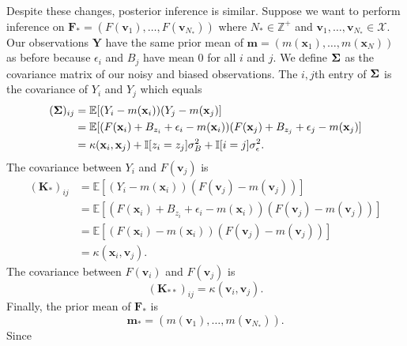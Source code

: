 Despite these changes, posterior inference is similar.
Suppose we want to perform inference on $\mathbf{F}_* = (F(\mathbf{v}_1), \dots, F(\mathbf{v}_{N_{*}}))$ where $N_{*} \in \mathbb{Z}^{+}$ and $\mathbf{v}_1, \dots, \mathbf{v}_{N_*} \in \mathcal{X}$.
Our observations $\mathbf{Y}$ have the same prior mean of $\mathbf{m} = (m(\mathbf{x}_1), \dots, m(\mathbf{x}_N))$ as before because $\epsilon_i$ and $B_j$ have mean 0 for all $i$ and $j$.
We define $\boldsymbol{\Sigma}$ as the covariance matrix of our noisy and biased observations.
The $i, j$th entry of $\boldsymbol{\Sigma}$ is the covariance of $Y_i$ and $Y_{j}$ which equals
\begin{align*}
    (\boldsymbol{\Sigma})_{ij}
    & = \mathbb{E}[(Y_i - m(\mathbf{x}_i))(Y_j - m(\mathbf{x}_j)] \\
    & = \mathbb{E}[(F(\mathbf{x}_i) + B_{z_i} + \epsilon_i - m(\mathbf{x}_i))(F(\mathbf{x}_j) + B_{z_j} + \epsilon_j - m(\mathbf{x}_j)] \\
    & = \kappa(\mathbf{x}_i, \mathbf{x}_{j}) + \mathbb{I}[z_i = z_{j}] \sigma^2_B + \mathbb{I}[i = j]\sigma^2_{ \epsilon }.
\end{align*}
The covariance between $Y_i$ and $F(\mathbf{v}_j)$ is
\begin{align*}
    (\mathbf{K}_{*})_{ij}
    & = \mathbb{E}[ (Y_i - m(\mathbf{x}_i))(F(\mathbf{v}_j) - m(\mathbf{v}_j)) ] \\
    & = \mathbb{E}[ (F(\mathbf{x}_i) + B_{z_i} + \epsilon_i - m(\mathbf{x}_i))(F(\mathbf{v}_j) - m(\mathbf{v}_j))] \\
    & = \mathbb{E}[ (F(\mathbf{x}_i) - m(\mathbf{x}_i))(F(\mathbf{v}_j) - m(\mathbf{v}_j))] \\
    & = \kappa(\mathbf{x}_i, \mathbf{v}_j).
\end{align*}
The covariance between $F(\mathbf{v}_i)$ and $F(\mathbf{v}_j)$ is
\begin{equation*}
    (\mathbf{K}_{* *})_{ij} = \kappa(\mathbf{v}_i, \mathbf{v}_j).
\end{equation*}
Finally, the prior mean of $\mathbf{F}_*$ is
\begin{equation*}
    \mathbf{m}_* = (m(\mathbf{v}_1), \dots, m(\mathbf{v}_{N_*})).
\end{equation*}
Since
